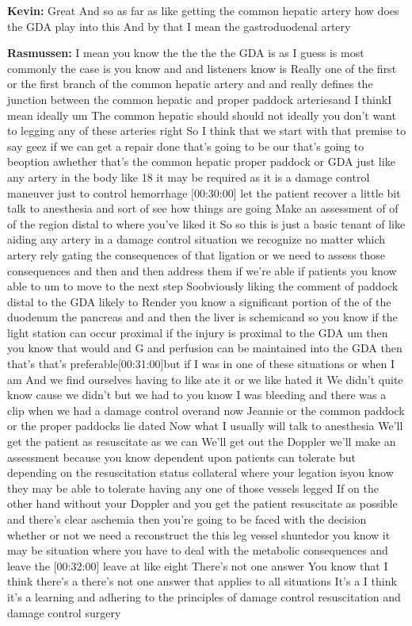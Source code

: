 \documentclass[
]{book}
\begin{document}
\textbf{Kevin:} Great And so as far as like getting the common hepatic artery
how does the GDA play into this And by that I mean the gastroduodenal
artery

\textbf{Rasmussen:} I mean you know the the the the GDA is as I guess is most
commonly the case is you know and and listeners know is Really one of
the first or the first branch of the common hepatic artery and and
really defines the junction between the common hepatic and proper
paddock arteriesand I thinkI mean ideally um The common hepatic should
should not ideally you don't want to legging any of these arteries right
So I think that we start with that premise to say geez if we can get a
repair done that's going to be our that's going to beoption awhether
that's the common hepatic proper paddock or GDA just like any artery in
the body like 18 it may be required as it is a damage control maneuver
just to control hemorrhage {[}00:30:00{]} let the patient recover a little
bit talk to anesthesia and sort of see how things are going Make an
assessment of of of the region distal to where you've liked it So so
this is just a basic tenant of like aiding any artery in a damage
control situation we recognize no matter which artery rely gating the
consequences of that ligation or we need to assess those consequences
and then and then address them if we're able if patients you know able
to um to move to the next step Soobviously liking the comment of paddock
distal to the GDA likely to Render you know a significant portion of the
of the duodenum the pancreas and and then the liver is schemicand so you
know if the light station can occur proximal if the injury is proximal
to the GDA um then you know that would and G and perfusion can be
maintained into the GDA then that's that's preferable{[}00:31:00{]}but if I
was in one of these situations or when I am And we find ourselves having
to like ate it or we like hated it We didn't quite know cause we didn't
but we had to you know I was bleeding and there was a clip when we had a
damage control overand now Jeannie or the common paddock or the proper
paddocks lie dated Now what I usually will talk to anesthesia We'll get
the patient as resuscitate as we can We'll get out the Doppler we'll
make an assessment because you know dependent upon patients can tolerate
but depending on the resuscitation status collateral where your legation
isyou know they may be able to tolerate having any one of those vessels
legged If on the other hand without your Doppler and you get the patient
resuscitate as possible and there's clear aschemia then you're going to
be faced with the decision whether or not we need a reconstruct the this
leg vessel shuntedor you know it may be situation where you have to deal
with the metabolic consequences and leave the {[}00:32:00{]} leave at like
eight There's not one answer You know that I think there's a there's not
one answer that applies to all situations It's a I think it's a learning
and adhering to the principles of damage control resuscitation and
damage control surgery
\end{document}
